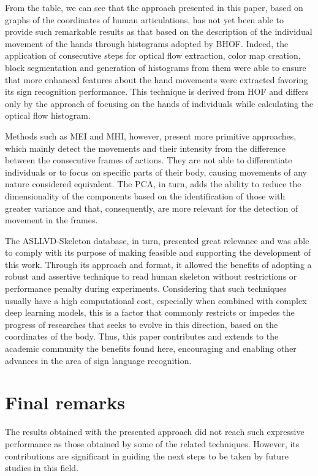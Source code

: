 From the table, we can see that the approach presented in this paper, based on graphs of the coordinates of human articulations, has not yet been able to provide such remarkable results as that based on the description of the individual movement of the hands through histograms adopted by BHOF. Indeed, the application of consecutive steps for optical flow extraction, color map creation, block segmentation and generation of histograms from them were able to ensure that more enhanced features about the hand movements were extracted favoring its sign recognition performance. This technique is derived from HOF and differs only by the approach of focusing on the hands of individuals while calculating the optical flow histogram.

Methods such as MEI and MHI, however, present more primitive approaches, which mainly detect the movements and their intensity from the difference between the consecutive frames of actions. They are not able to differentiate individuals or to focus on specific parts of their body, causing movements of any nature considered equivalent. The PCA, in turn, adds the ability to reduce the dimensionality of the components based on the identification of those with greater variance and that, consequently, are more relevant for the detection of movement in the frames.

The ASLLVD-Skeleton database, in turn, presented great relevance and was able to comply with its purpose of making feasible and supporting the development of this work.  Through its approach and format, it allowed the benefits of adopting a robust and assertive technique to read human skeleton without restrictions or performance penalty during experiments. Considering that such techniques usually have a high computational cost, especially when combined with complex deep learning models, this is a factor that commonly restricts or impedes the progress of researches that seeks to evolve in this direction, based on the coordinates of the body. Thus, this paper contributes and extends to the academic community the benefits found here, encouraging and enabling other advances in the area of sign language recognition.


\section{Final remarks} 
\label{sec:final-remarks}

The results obtained with the presented approach did not reach such expressive performance as those obtained by some of the related techniques. However, its contributions are significant in guiding the next steps to be taken by future studies in this field.


